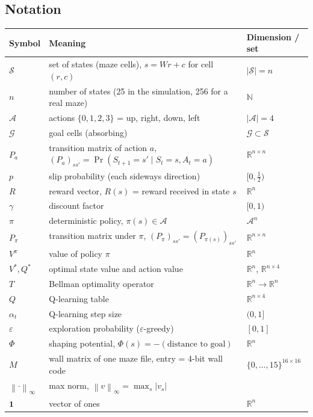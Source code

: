 \documentclass[10pt]{article}
\theoremstyle{definition}
\newcommand{\R}{\mathbb{R}}
\newcommand{\one}{\mathbf{1}}
\newcommand{\norm}[1]{\left\lVert #1\right\rVert_\infty}
\newcommand{\Sset}{\mathcal{S}}
\newcommand{\Aset}{\mathcal{A}}
\newcommand{\Gset}{\mathcal{G}}
\begin{document}
\subsection{Notation}

\begin{center}
\small
\begin{tabular}{l p{} l}
\toprule
Symbol & Meaning & Dimension / set\\
\midrule
$\Sset$ & set of states (maze cells), $s = Wr+c$ for cell $(r,c)$ & $|\Sset| = n$\\
$n$ & number of states (25 in the simulation, 256 for a real maze) & $\mathbb{N}$\\
$\Aset$ & actions $\{0,1,2,3\}$ = up, right, down, left & $|\Aset| = 4$\\
$\Gset$ & goal cells (absorbing) & $\Gset\subset\Sset$\\
$P_a$ & transition matrix of action $a$, $(P_a)_{ss'} = \Pr(S_{t+1}=s' \mid S_t = s, A_t = a)$ & $\R^{n\times n}$\\
$p$ & slip probability (each sideways direction) & $[0,\tfrac12)$\\
$R$ & reward vector, $R(s)$ = reward received in state $s$ & $\R^n$\\
$\gamma$ & discount factor & $[0,1)$\\
$\pi$ & deterministic policy, $\pi(s)\in\Aset$ & $\Aset^n$\\
$P_\pi$ & transition matrix under $\pi$, $(P_\pi)_{ss'} = (P_{\pi(s)})_{ss'}$ & $\R^{n\times n}$\\
$V^\pi$ & value of policy $\pi$ & $\R^n$\\
$V^*, Q^*$ & optimal state value and action value & $\R^n$, $\R^{n\times 4}$\\
$T$ & Bellman optimality operator & $\R^n\to\R^n$\\
$Q$ & Q-learning table & $\R^{n\times 4}$\\
$\alpha_t$ & Q-learning step size & $(0,1]$\\
$\varepsilon$ & exploration probability ($\varepsilon$-greedy) & $[0,1]$\\
$\Phi$ & shaping potential, $\Phi(s) = -(\text{distance to goal})$ & $\R^n$\\
$M$ & wall matrix of one maze file, entry = 4-bit wall code & $\{0,\dots,15\}^{16\times16}$\\
$\norm{\cdot}$ & max norm, $\norm{v} = \max_s |v_s|$ & \\
$\one$ & vector of ones & $\R^n$\\
\bottomrule
\end{tabular}
\end{center}
\end{document}
